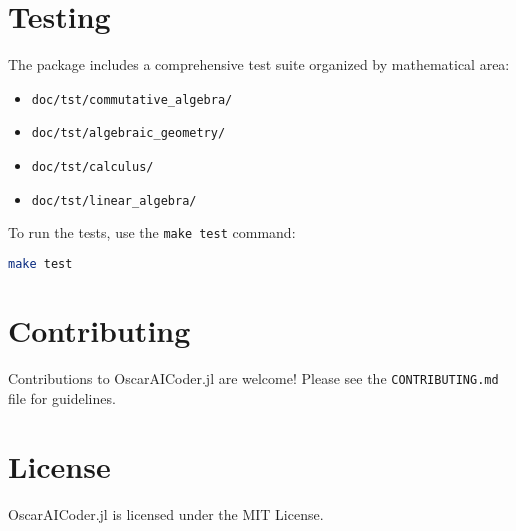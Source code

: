 \documentclass[11pt,a4paper]{article}
\begin{document}
\section{Testing}

The package includes a comprehensive test suite organized by mathematical area:

\begin{itemize}
    \item \texttt{doc/tst/commutative\_algebra/}
    \item \texttt{doc/tst/algebraic\_geometry/}
    \item \texttt{doc/tst/calculus/}
    \item \texttt{doc/tst/linear\_algebra/}
\end{itemize}

To run the tests, use the \texttt{make test} command:

\begin{lstlisting}[language=bash]
make test
\end{lstlisting}

\section{Contributing}

Contributions to OscarAICoder.jl are welcome! Please see the \texttt{CONTRIBUTING.md} file for guidelines.

\section{License}

OscarAICoder.jl is licensed under the MIT License.
\end{document}
